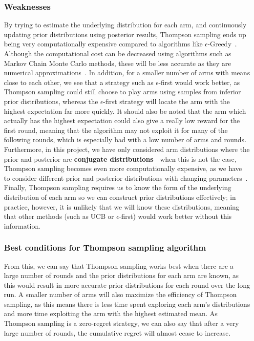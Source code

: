 \subsubsection{Weaknesses}
By trying to estimate the underlying distribution for each arm, and continuously updating prior distributions using posterior results, Thompson sampling ends up being very computationally expensive compared to algorithms like $\epsilon$-Greedy~\citep{mazumdar2020thompson}.
Although the computational cost can be decreased using algorithms such as Markov Chain Monte Carlo methods, these will be less accurate as they are numerical approximations~\citep{mazumdar2020thompson}.
In addition, for a smaller number of arms with means close to each other, we see that a strategy such as $\epsilon$-first would work better, as Thompson sampling could still choose to play arms using samples from inferior prior distributions, whereas the $\epsilon$-first strategy will locate the arm with the highest expectation far more quickly.
It should also be noted that the arm which actually has the highest expectation could also give a really low reward for the first round, meaning that the algorithm may not exploit it for many of the following rounds, which is especially bad with a low number of arms and rounds.
Furthermore, in this project, we have only considered arm distributions where the prior and posterior are \textbf{conjugate distributions} - when this is not the case, Thompson sampling becomes even more computationally expensive, as we have to consider different prior and posterior distributions with changing parameters~\citep{zhou2018racing}.
Finally, Thompson sampling requires us to know the form of the underlying distribution of each arm so we can construct prior distributions effectively; 
in practice, however, it is unlikely that we will know these distributions, meaning that other methods (such as UCB or $\epsilon$-first) would work better without this information.

\subsubsection{Best conditions for Thompson sampling algorithm}
From this, we can say that Thompson sampling works best when there are a large number of rounds and the prior distributions for each arm are known, as this would result in more accurate prior distributions for each round over the long run.
A smaller number of arms will also maximize the efficiency of Thompson sampling, as this means there is less time spent exploring each arm's distributions and more time exploiting the arm with the highest estimated mean.
As Thompson sampling is a zero-regret strategy, we can also say that after a very large number of rounds, the cumulative regret will almost cease to increase.

